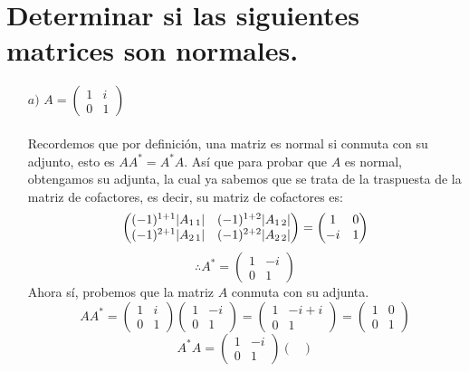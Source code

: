 \section{Determinar si las siguientes matrices son normales.}    
\begin{itemize}
    \item [$a)$] $A=\begin{pmatrix}
	1 & i \\
	0 & 1 \end{pmatrix}$\\\\
	Recordemos que por definición, una matriz es normal si conmuta con su adjunto, esto es $AA^*=A^*A$. Así que para probar que $A$ es normal, obtengamos su adjunta, la cual ya sabemos que se trata de la traspuesta de la matriz de cofactores, es decir, su matriz de cofactores es:\[\begin{pmatrix}
	(-1)^{1+1}|A_{1\hspace{0.5mm}1}| & (-1)^{1+2}|A_{1\hspace{0.5mm}2}| \\
	(-1)^{2+1}|A_{2\hspace{0.5mm}1}| & (-1)^{2+2}|A_{2\hspace{0.5mm}2}|\end{pmatrix}=\begin{pmatrix}
	1 & 0 \\
	-i & 1 \end{pmatrix}\]
\[\therefore A^*=\begin{pmatrix}
	1 & -i \\
	0 & 1 \end{pmatrix}\]
	Ahora sí, probemos que la matriz $A$ conmuta con su adjunta.
	\[AA^*=\begin{pmatrix}
	1 & i \\
	0 & 1 \end{pmatrix}\begin{pmatrix}
	1 & -i \\
	0 & 1 \end{pmatrix} = \begin{pmatrix}
	1 & -i+i \\
	0 & 1 \end{pmatrix}=\begin{pmatrix}
	1 & 0 \\
	0 & 1 \end{pmatrix}\]
	\[A^*A=\begin{pmatrix}
	1 & -i \\
	0 & 1 \end{pmatrix}\begin{pmatrix}

\end{pmatrix}\]
\end{itemize}
